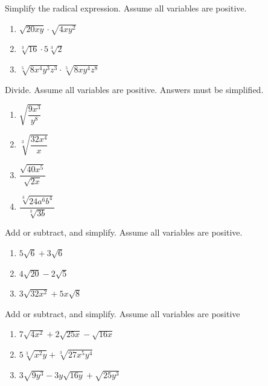 \documentclass[en,12pt]{elegantbook}
\providecommand{\tightlist}{%
  \setlength{\itemsep}{0pt}\setlength{\parskip}{0pt}}
\let\BeginKnitrBlock\begin \let\EndKnitrBlock\end
\begin{document}
\BeginKnitrBlock{exercise}
\protect\hypertarget{exr:unnamed-chunk-109}{}{\label{exr:unnamed-chunk-109} }
Simplify the radical expression. Assume all variables are positive.

\begin{enumerate}
\def\labelenumi{\arabic{enumi}.}
\tightlist
\item
  \(\sqrt{20xy}\cdot\sqrt{4xy^2}\)
\item
  \(\sqrt[3]{16}\cdot5\sqrt[3]{2}\)
\item
  \(\sqrt[5]{8x^4y^3z^3}\cdot\sqrt[5]{8xy^4z^8}\)
\end{enumerate}
\EndKnitrBlock{exercise}

\BeginKnitrBlock{exercise}
\protect\hypertarget{exr:unnamed-chunk-110}{}{\label{exr:unnamed-chunk-110} }
Divide. Assume all variables are positive. Answers must be simplified.

\begin{enumerate}
\def\labelenumi{\arabic{enumi}.}
\tightlist
\item
  \(\sqrt{\dfrac{9x^3}{y^8}}\)
\item
  \(\sqrt[3]{\dfrac{32x^4}{x}}\)
\item
  \(\dfrac{\sqrt{40x^5}}{\sqrt{2x}}\)
\item
  \(\dfrac{\sqrt[3]{24a^6b^4}}{\sqrt[3]{3b}}\)
\end{enumerate}
\EndKnitrBlock{exercise}

\BeginKnitrBlock{exercise}
\protect\hypertarget{exr:unnamed-chunk-111}{}{\label{exr:unnamed-chunk-111} }
Add or subtract, and simplify. Assume all variables are positive.

\begin{enumerate}
\def\labelenumi{\arabic{enumi}.}
\tightlist
\item
  \(5\sqrt6+3\sqrt6\)
\item
  \(4\sqrt{20}-2\sqrt5\)
\item
  \(3\sqrt{32x^2}+5x\sqrt{8}\)
\end{enumerate}
\EndKnitrBlock{exercise}

\BeginKnitrBlock{exercise}
\protect\hypertarget{exr:unnamed-chunk-112}{}{\label{exr:unnamed-chunk-112} }
Add or subtract, and simplify. Assume all variables are positive

\begin{enumerate}
\def\labelenumi{\arabic{enumi}.}
\tightlist
\item
  \(7\sqrt{4x^2}+2\sqrt{25x}-\sqrt{16x}\)
\item
  \(5\sqrt[3]{x^2y}+\sqrt[3]{27x^5y^4}\)
\item
  \(3\sqrt{9y^3}-3y\sqrt{16y}+\sqrt{25y^3}\)
\end{enumerate}
\EndKnitrBlock{exercise}
\end{document}
